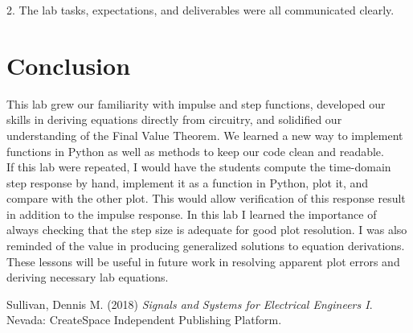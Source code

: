 \documentclass[12pt]{report}
\begin{document}
2. The lab tasks, expectations, and deliverables were all communicated clearly. \\
	
\section{Conclusion}

This lab grew our familiarity with impulse and step functions, developed our skills in deriving equations directly from circuitry, and solidified our understanding of the Final Value Theorem. We learned a new way to implement functions in Python as well as methods to keep our code clean and readable. \\

If this lab were repeated, I would have the students compute the time-domain step response by hand, implement it as a function in Python, plot it, and compare with the other plot. This would allow verification of this response result in addition to the impulse response. In this lab I learned the importance of always checking that the step size is adequate for good plot resolution. I was also reminded of the value in producing generalized solutions to equation derivations. These lessons will be useful in future work in resolving apparent plot errors and deriving necessary lab equations. \\
	
\newpage
\begin{thebibliography}{111}
		
Sullivan, Dennis M. (2018) {\it  Signals and Systems for Electrical Engineers I}. Nevada: CreateSpace Independent Publishing Platform.
		
\end{thebibliography}
\end{document}
